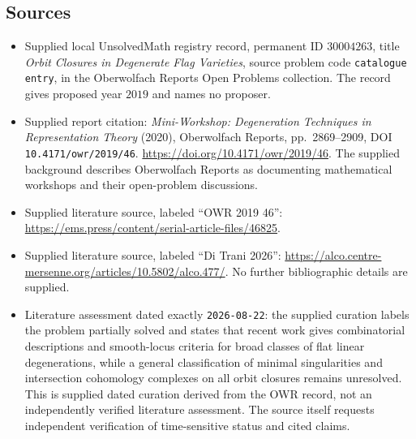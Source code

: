 \documentclass[11pt]{article}
\begin{document}
\subsection{Sources}
\begin{itemize}
\item Supplied local UnsolvedMath registry record, permanent ID \(30004263\), title \emph{Orbit Closures in Degenerate Flag Varieties}, source problem code \texttt{catalogue entry}, in the Oberwolfach Reports Open Problems collection. The record gives proposed year \(2019\) and names no proposer.
\item Supplied report citation: \emph{Mini-Workshop: Degeneration Techniques in Representation Theory} (2020), Oberwolfach Reports, pp.~2869--2909, DOI \texttt{10.4171/owr/2019/46}. \url{https://doi.org/10.4171/owr/2019/46}. The supplied background describes Oberwolfach Reports as documenting mathematical workshops and their open-problem discussions.
\item Supplied literature source, labeled ``OWR 2019 46'': \url{https://ems.press/content/serial-article-files/46825}.
\item Supplied literature source, labeled ``Di Trani 2026'': \url{https://alco.centre-mersenne.org/articles/10.5802/alco.477/}. No further bibliographic details are supplied.
\item Literature assessment dated exactly \texttt{2026-08-22}: the supplied curation labels the problem partially solved and states that recent work gives combinatorial descriptions and smooth-locus criteria for broad classes of flat linear degenerations, while a general classification of minimal singularities and intersection cohomology complexes on all orbit closures remains unresolved. This is supplied dated curation derived from the OWR record, not an independently verified literature assessment. The source itself requests independent verification of time-sensitive status and cited claims.
\end{itemize}
\end{document}
